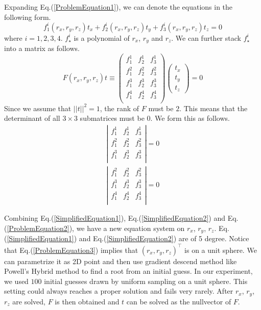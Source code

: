\documentclass[letterpaper, 10 pt, conference]{ieeeconf}
\begin{document}
Expanding Eq.(\ref{ProblemEquation1}), we can denote the equations in the following form. 
\begin{equation}
f_1^i(r_x, r_y, r_z) t_x + f_2^i(r_x, r_y, r_z) t_y + f_3^i(r_x, r_y, r_z) t_z = 0
\end{equation}
where $i = 1, 2, 3, 4$. $f_\star^i$ is a polynomial of $r_x$, $r_y$ and $r_z$. We can further stack $f_\star^i$ into a matrix as follows. 
\begin{equation}
F(r_x, r_y, r_z) t \equiv \left( 
	\begin{array}{clr}
	f_1^1 & f_2^1 & f_3^1 \\
	f_1^2 & f_2^2 & f_3^2 \\
	f_1^3 & f_2^3 & f_3^3 \\
	f_1^4 & f_2^4 & f_3^4 \\	
	\end{array}
\right) \left(
	\begin{array}{clr}
	t_x \\ t_y \\t_z
	\end{array}
\right) = 0	
\end{equation}
Since we assume that $||t||^2 = 1$, the rank of $F$ must be $2$. This means that the determinant of all $3 \times 3$ submatrices must be 0. We form this as follows. 
\begin{eqnarray}
\label{SimplifiedEquation1}
\left| 
	\begin{array}{clr}
	f_1^1 & f_2^1 & f_3^1 \\
	f_1^2 & f_2^2 & f_3^2 \\
	f_1^3 & f_2^3 & f_3^3 \\
	\end{array}
\right| = 0 \\ 
\label{SimplifiedEquation2}
\left| 
	\begin{array}{clr}
	f_1^2 & f_2^2 & f_3^2 \\
	f_1^3 & f_2^3 & f_3^3 \\
	f_1^4 & f_2^4 & f_3^4 \\	
	\end{array}
\right| = 0 
\end{eqnarray}

Combining Eq.(\ref{SimplifiedEquation1}), Eq.(\ref{SimplifiedEquation2}) and Eq.(\ref{ProblemEquation2}), we have a new equation system on $r_x$, $r_y$, $r_z$. Eq.(\ref{SimplifiedEquation1}) and Eq.(\ref{SimplifiedEquation2}) are of 5 degree. Notice that Eq.(\ref{ProblemEquation3}) implies that $(r_x, r_y, r_z)^\top$ is on a unit sphere. We can parametrize it as 2D point and then use gradient descend method like Powell's Hybrid method \cite{powell1964efficient} to find a root from an initial guess. In our experiment, we used $100$ initial guesses drawn by uniform sampling on a unit sphere. This setting could always reaches a proper solution and fails very rarely. After $r_x$, $r_y$, $r_z$ are solved, $F$ is then obtained and $t$ can be solved as the nullvector of $F$. 
\end{document}
